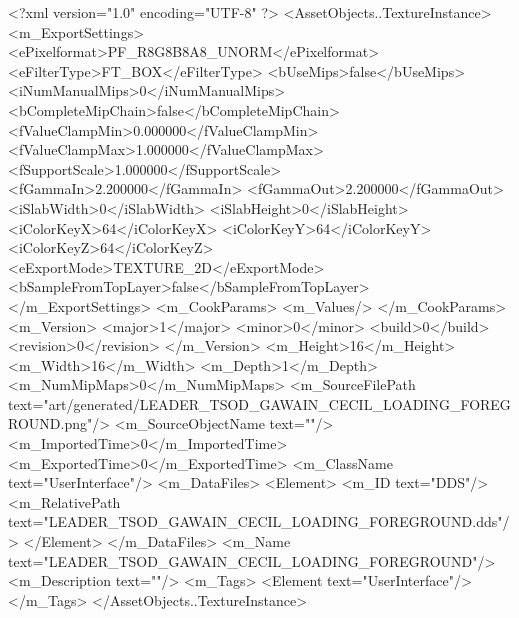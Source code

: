 <?xml version="1.0" encoding="UTF-8" ?>
<AssetObjects..TextureInstance>
	<m_ExportSettings>
		<ePixelformat>PF_R8G8B8A8_UNORM</ePixelformat>
		<eFilterType>FT_BOX</eFilterType>
		<bUseMips>false</bUseMips>
		<iNumManualMips>0</iNumManualMips>
		<bCompleteMipChain>false</bCompleteMipChain>
		<fValueClampMin>0.000000</fValueClampMin>
		<fValueClampMax>1.000000</fValueClampMax>
		<fSupportScale>1.000000</fSupportScale>
		<fGammaIn>2.200000</fGammaIn>
		<fGammaOut>2.200000</fGammaOut>
		<iSlabWidth>0</iSlabWidth>
		<iSlabHeight>0</iSlabHeight>
		<iColorKeyX>64</iColorKeyX>
		<iColorKeyY>64</iColorKeyY>
		<iColorKeyZ>64</iColorKeyZ>
		<eExportMode>TEXTURE_2D</eExportMode>
		<bSampleFromTopLayer>false</bSampleFromTopLayer>
	</m_ExportSettings>
	<m_CookParams>
		<m_Values/>
	</m_CookParams>
	<m_Version>
		<major>1</major>
		<minor>0</minor>
		<build>0</build>
		<revision>0</revision>
	</m_Version>
	<m_Height>16</m_Height>
	<m_Width>16</m_Width>
	<m_Depth>1</m_Depth>
	<m_NumMipMaps>0</m_NumMipMaps>
	<m_SourceFilePath text="art/generated/LEADER_TSOD_GAWAIN_CECIL_LOADING_FOREGROUND.png"/>
	<m_SourceObjectName text=""/>
	<m_ImportedTime>0</m_ImportedTime>
	<m_ExportedTime>0</m_ExportedTime>
	<m_ClassName text="UserInterface"/>
	<m_DataFiles>
		<Element>
			<m_ID text="DDS"/>
			<m_RelativePath text="LEADER_TSOD_GAWAIN_CECIL_LOADING_FOREGROUND.dds"/>
		</Element>
	</m_DataFiles>
	<m_Name text="LEADER_TSOD_GAWAIN_CECIL_LOADING_FOREGROUND"/>
	<m_Description text=""/>
	<m_Tags>
		<Element text="UserInterface"/>
	</m_Tags>
</AssetObjects..TextureInstance>
